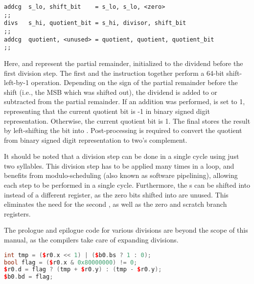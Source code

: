 \begin{lstlisting}[numbers=none, basicstyle=\ttfamily\footnotesize, language=vexasm]
addcg  s_lo, shift_bit    = s_lo, s_lo, <zero>
;;
divs   s_hi, quotient_bit = s_hi, divisor, shift_bit
;;
addcg  quotient, <unused> = quotient, quotient, quotient_bit
;;
\end{lstlisting}

\noindent Here,  and  represent the partial remainder,
initialized to the dividend before the first division step. The first
 and the  instruction together perform a 64-bit
shift-left-by-1 operation. Depending on the sign of the partial remainder before
the shift (i.e., the MSB which was shifted out), the dividend is added to or
subtracted from the partial remainder. If an addition was performed,
 is set to 1, representing that the current quotient bit is
-1 in binary signed digit representation. Otherwise, the current quotient bit is
1. The final  stores the result by left-shifting the bit into
. Post-processing is required to convert the quotient from binary
signed digit representation to two's complement.

It should be noted that a division step can be done in a single cycle using just
two syllables. This division step has to be applied many times in a loop, and
benefits from modulo-scheduling (also known as software pipelining), allowing
each step to be performed in a single cycle. Furthermore, the
s can be shifted into  instead of a different
register, as the zero bits shifted into  are unused. This eliminates
the need for the second , as well as the zero and scratch branch
registers.

The prologue and epilogue code for various divisions are beyond the scope of
this manual, as the compilers take care of expanding divisions.

\begin{lstlisting}[numbers=none, basicstyle=\ttfamily\footnotesize, language=C++]
int tmp = ($r0.x << 1) | ($b0.bs ? 1 : 0);
bool flag = ($r0.x & 0x80000000) != 0;
$r0.d = flag ? (tmp + $r0.y) : (tmp - $r0.y);
$b0.bd = flag;
\end{lstlisting}

